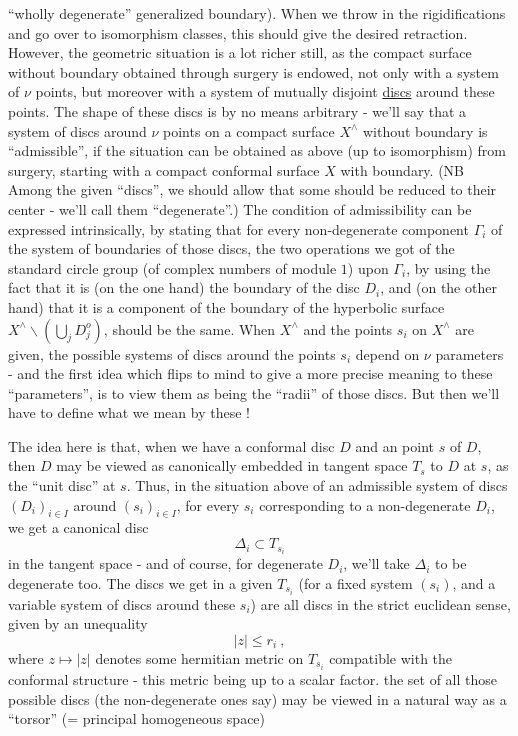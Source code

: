 ``wholly degenerate'' generalized boundary). When we throw in the rigidifications and go over to isomorphism classes, this should give the desired retraction. However, the geometric situation is a lot richer still, as the compact surface without boundary obtained through surgery is endowed, not only with a system of $\nu$ points, but moreover with a system of mutually disjoint \uline{discs} around these points. The shape of these discs is by no means arbitrary - we'll say that a system of discs around $\nu$ points on a compact  surface $X^{\wedge}$ without boundary is ``admissible'', if the situation can be obtained as above (up to isomorphism) from surgery, starting with a compact conformal surface $X$ with boundary. (NB Among the given ``discs'', we should allow that some should be reduced to their center - we'll call them ``degenerate''.) The condition of admissibility can be expressed intrinsically, by stating that  for every non-degenerate component $\Gamma_i$ of the system of boundaries of those discs, the two operations we got of the standard circle group (of complex numbers of module $1$) upon $\Gamma_i$, by using the fact that it is (on the one hand) the boundary of the disc $D_i$, and (on the other hand) that it is a component of the boundary of the hyperbolic surface $X^{\wedge}\backslash(\bigcup_j D_j^{o})$, should be the same. When $X^{\wedge}$ and the points $s_i$ on $X^{\wedge}$ are given, the possible  systems of discs around the points $s_i$ depend on $\nu$ parameters - and the first idea which flips to mind to give a more precise meaning to these ``parameters'', is to view them as being the ``radii'' of those discs. But then we'll have to define what we mean by these !
\margin{!}

The idea here is that, when we have a conformal disc $D$ and an  point $s$ of $D$, then $D$ may be viewed as canonically embedded in  tangent space $T_s$ to $D$ at $s$, as the ``unit disc'' at $s$. Thus, in the situation above of an admissible system of discs $(D_i)_{i\in I}$ around $(s_i)_{i\in I}$, for every $s_i$ corresponding to a non-degenerate $D_i$, we get a canonical disc
\[
\Delta_i\subset T_{s_i}
\]
in the tangent space - and of course, for degenerate $D_i$, we'll take $\Delta_i$ to be degenerate too. The discs we get in a given $T_{s_i}$ (for a fixed system $(s_i)$, and a variable  system of discs around these $s_i$) are all discs in the strict euclidean sense, given by an unequality
\[
|z|\le r_i\ ,
\]
where $z\mapsto|z|$ denotes some hermitian metric on $T_{s_i}$ compatible with the conformal structure - this metric being  up to a scalar factor. the set of all those possible discs (the non-degenerate ones\deleted{\unsure{,}} say) may be viewed in a natural way as a ``torsor'' (= principal homogeneous space)
